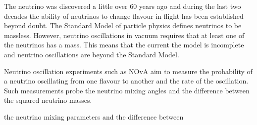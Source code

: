 The neutrino was discovered a little over 60 years ago and during the
last two decades the ability of neutrinos to change flavour in flight
has been established beyond doubt.   
The Standard Model of particle physics defines neutrinos to be
massless. However, neutrino oscillations in vacuum requires that at
least one of the neutrinos has a mass. This means that the current
the model is incomplete and neutrino oscillations are beyond the
Standard Model.

Neutrino oscillation experiments such as NOvA aim to measure 
the probability of a neutrino oscillating from one flavour to another
and the rate of the oscillation. Such measurements probe the neutrino
mixing angles and the difference between the squared neutrino masses. 

the neutrino mixing parameters and the difference between 











